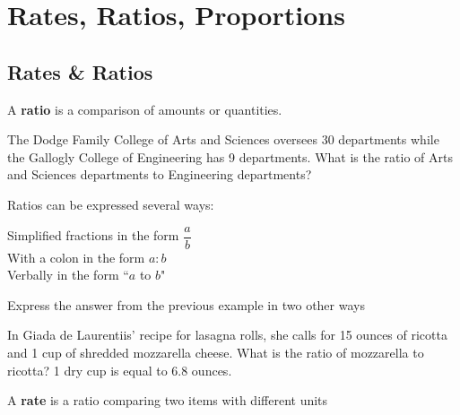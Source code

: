 \documentclass[notes]{subfiles}
\begin{document}
	\fancyhead[LO,RE]{\bfseries \currentname}
	\fancyfoot[C]{{}}
	\fancyfoot[RO,LE]{\large \thepage}	%

\section*{Rates, Ratios, Proportions}\label{rrp}
	\subsection*{Rates \& Ratios}
	
		\begin{defn}[Ratio]
			A \textbf{ratio} is a comparison of amounts or quantities.%
		\end{defn}
		
		\begin{ex}
			The Dodge Family College of Arts and Sciences oversees 30 departments while the Gallogly College of Engineering has 9 departments.  What is the ratio of Arts and Sciences departments to Engineering departments?%
		\end{ex}
			
		Ratios can be expressed several ways:
		\begin{rmk}
			\tabitem Simplified fractions in the form \(\dfrac{a}{b}\)\\[15pt]
			\tabitem With a colon in the form \(a:b\)\\[15pt]
			\tabitem Verbally in the form ``\(a\) to \(b\)"%
		\end{rmk}
		
		\begin{ex}
			Express the answer from the previous example in two other ways%
		\end{ex}	
			\newpage
		
		\begin{ex}
			In Giada de Laurentiis' recipe for lasagna rolls, she calls for 15 ounces of ricotta and 1 cup of shredded mozzarella cheese.  What is the ratio of mozzarella to ricotta?  1 dry cup is equal to 6.8 ounces.%
		\end{ex}
		
		\begin{defn}[Rate]
			A \textbf{rate} is a ratio comparing two items with different units%
		\end{defn}
		
\end{document}

